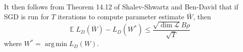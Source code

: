\documentclass[10pt]{article}
\theoremstyle{definition}
\DeclareMathOperator{\E}{\mathbb E}
\DeclareMathOperator*{\argmin}{arg\,min}
\newcommand{\trans}[1]{{#1}^{T}}
\newcommand{\w}{\mathbf w}
\newcommand{\x}{\mathbf x}
\newcommand{\dist}[2]{d_{{#1},{#2}}}
\begin{document}
It then follows from Theorem 14.12 of Shalev-Shwartz and Ben-David that if SGD is run for $T$ iterations to compute parameter estimate $\bar W$,
then
\begin{equation}
    \E L_D(\bar W) - L_D(W^*) \le \frac {\sqrt {\dim \mathcal L}B\rho}{\sqrt T}
\end{equation}
where $W^* = \argmin L_D(W)$.

%
%
%
\end{document}
